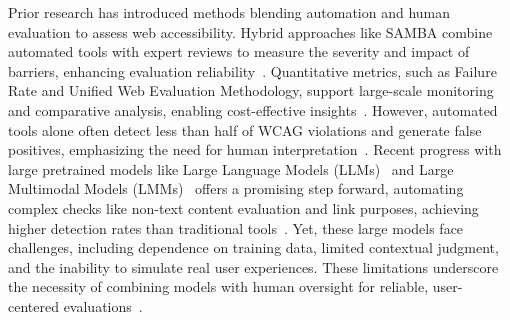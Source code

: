 \begin{highlight}
{Prior research has introduced methods blending automation and human evaluation to assess web accessibility. Hybrid approaches like SAMBA combine automated tools with expert reviews to measure the severity and impact of barriers, enhancing evaluation reliability~\cite{brajnik2007samba}. Quantitative metrics, such as Failure Rate and Unified Web Evaluation Methodology, support large-scale monitoring and comparative analysis, enabling cost-effective insights~\cite{vigo2007quantitative, martins2024large}. However, automated tools alone often detect less than half of WCAG violations and generate false positives, emphasizing the need for human interpretation~\cite{freire2008evaluation, vigo2013benchmarking}. Recent progress with large pretrained models like Large Language Models (LLMs)~\cite{dubey2024llama,bai2023qwen} and Large Multimodal Models (LMMs)~\cite{liu2024visual, bai2023qwenvl} offers a promising step forward, automating complex checks like non-text content evaluation and link purposes, achieving higher detection rates than traditional tools~\cite{lopez2024turning, delnevo2024interaction}. Yet, these large models face challenges, including dependence on training data, limited contextual judgment, and the inability to simulate real user experiences. These limitations underscore the necessity of combining models with human oversight for reliable, user-centered evaluations~\cite{brajnik2007samba, vigo2013benchmarking, delnevo2024interaction}. 

}
\end{highlight}
